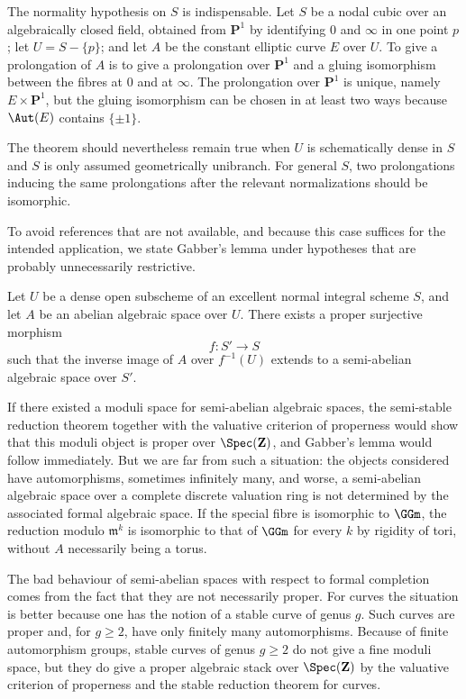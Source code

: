 \begin{remark}
The normality hypothesis on $S$ is indispensable. Let $S$ be a nodal cubic over an algebraically closed field, obtained from $\mathbf P^1$ by identifying $0$ and $\infty$ in one point $p$; let $U=S-\{p\}$; and let $A$ be the constant elliptic curve $E$ over $U$. To give a prolongation of $A$ is to give a prolongation over $\mathbf P^1$ and a gluing isomorphism between the fibres at $0$ and at $\infty$. The prolongation over $\mathbf P^1$ is unique, namely $E\times \mathbf P^1$, but the gluing isomorphism can be chosen in at least two ways because $\Aut(E)$ contains $\{\pm 1\}$.

The theorem should nevertheless remain true when $U$ is schematically dense in $S$ and $S$ is only assumed geometrically unibranch. For general $S$, two prolongations inducing the same prolongations after the relevant normalizations should be isomorphic.
\end{remark}

To avoid references that are not available, and because this case suffices for the intended application, we state Gabber's lemma under hypotheses that are probably unnecessarily restrictive.

\begin{theorem}\label{thm:gabber}
Let $U$ be a dense open subscheme of an excellent normal integral scheme $S$, and let $A$ be an abelian algebraic space over $U$. There exists a proper surjective morphism
\[
  f:S'\longrightarrow S
\]
such that the inverse image of $A$ over $f^{-1}(U)$ extends to a semi-abelian algebraic space over $S'$.
\end{theorem}

If there existed a moduli space for semi-abelian algebraic spaces, the semi-stable reduction theorem together with the valuative criterion of properness would show that this moduli object is proper over $\Spec(\mathbf Z)$, and Gabber's lemma would follow immediately. But we are far from such a situation: the objects considered have automorphisms, sometimes infinitely many, and worse, a semi-abelian algebraic space over a complete discrete valuation ring is not determined by the associated formal algebraic space. If the special fibre is isomorphic to $\GGm$, the reduction modulo $\mathfrak m^k$ is isomorphic to that of $\GGm$ for every $k$ by rigidity of tori, without $A$ necessarily being a torus.

The bad behaviour of semi-abelian spaces with respect to formal completion comes from the fact that they are not necessarily proper. For curves the situation is better because one has the notion of a stable curve of genus $g$. Such curves are proper and, for $g\ge 2$, have only finitely many automorphisms. Because of finite automorphism groups, stable curves of genus $g\ge2$ do not give a fine moduli space, but they do give a proper algebraic stack over $\Spec(\mathbf Z)$ by the valuative criterion of properness and the stable reduction theorem for curves.

